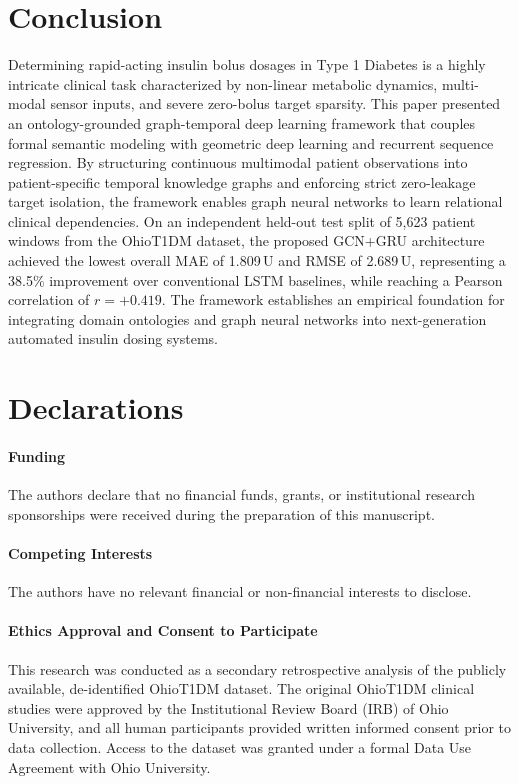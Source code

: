 \documentclass[10pt,a4paper]{article}
\begin{document}
\section{Conclusion}
Determining rapid-acting insulin bolus dosages in Type 1 Diabetes is a highly intricate clinical task characterized by non-linear metabolic dynamics, multi-modal sensor inputs, and severe zero-bolus target sparsity. This paper presented an ontology-grounded graph-temporal deep learning framework that couples formal semantic modeling with geometric deep learning and recurrent sequence regression. By structuring continuous multimodal patient observations into patient-specific temporal knowledge graphs and enforcing strict zero-leakage target isolation, the framework enables graph neural networks to learn relational clinical dependencies. On an independent held-out test split of 5,623 patient windows from the OhioT1DM dataset, the proposed GCN+GRU architecture achieved the lowest overall MAE of 1.809\,U and RMSE of 2.689\,U, representing a 38.5\% improvement over conventional LSTM baselines, while reaching a Pearson correlation of $r = +0.419$. The framework establishes an empirical foundation for integrating domain ontologies and graph neural networks into next-generation automated insulin dosing systems.

\section*{Declarations}

\paragraph{Funding}
The authors declare that no financial funds, grants, or institutional research sponsorships were received during the preparation of this manuscript.

\paragraph{Competing Interests}
The authors have no relevant financial or non-financial interests to disclose.

\paragraph{Ethics Approval and Consent to Participate}
This research was conducted as a secondary retrospective analysis of the publicly available, de-identified OhioT1DM dataset. The original OhioT1DM clinical studies were approved by the Institutional Review Board (IRB) of Ohio University, and all human participants provided written informed consent prior to data collection. Access to the dataset was granted under a formal Data Use Agreement with Ohio University.
\end{document}
